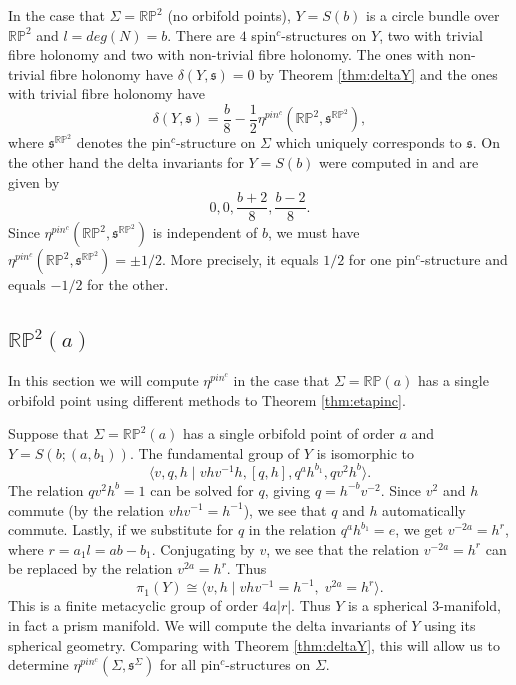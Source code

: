 \documentclass{amsart}
\theoremstyle{definition}
\theoremstyle{remark}
\numberwithin{equation}{section}
\begin{document}
In the case that $\Sigma = \mathbb{RP}^2$ (no orbifold points), $Y = S(b)$ is a circle bundle over $\mathbb{RP}^2$ and $l = deg(N) = b$. There are $4$ spin$^c$-structures on $Y$, two with trivial fibre holonomy and two with non-trivial fibre holonomy. The ones with non-trivial fibre holonomy have $\delta(Y , \mathfrak{s}) = 0$ by Theorem \ref{thm:deltaY} and the ones with trivial fibre holonomy have
\[
\delta( Y , \mathfrak{s} ) = \frac{b}{8} - \frac{1}{2} \eta^{pin^c}(\mathbb{RP}^2 , \mathfrak{s}^{\mathbb{RP}^2}),
\]
where $\mathfrak{s}^{\mathbb{RP}^2}$ denotes the pin$^c$-structure on $\Sigma$ which uniquely corresponds to $\mathfrak{s}$. On the other hand the delta invariants for $Y = S(b)$ were computed in \cite[]{bar} and are given by
\[
0,0, \frac{b+2}{8}, \frac{b-2}{8}.
\]
Since $\eta^{pin^c}(\mathbb{RP}^2 , \mathfrak{s}^{\mathbb{RP}^2})$ is independent of $b$, we must have $\eta^{pin^c}( \mathbb{RP}^2 , \mathfrak{s}^{\mathbb{RP}^2}) = \pm 1/2$. More precisely, it equals $1/2$ for one pin$^c$-structure and equals $-1/2$ for the other.



\subsection{$\mathbb{RP}^2(a)$}\label{sec:rp2a}

In this section we will compute $\eta^{pin^c}$ in the case that $\Sigma = \mathbb{RP}(a)$ has a single orbifold point using different methods to Theorem \ref{thm:etapinc}.

Suppose that $\Sigma = \mathbb{RP}^2(a)$ has a single orbifold point of order $a$ and $Y = S( b ; (a , b_1))$. The fundamental group of $Y$ is isomorphic to
\[
\langle v , q , h \; | \; vhv^{-1}h, [q,h] , q^a h^{b_1} , qv^2 h^b \rangle.
\]
The relation $qv^2 h^b = 1$ can be solved for $q$, giving $q = h^{-b} v^{-2}$. Since $v^2$ and $h$ commute (by the relation $vhv^{-1} = h^{-1}$), we see that $q$ and $h$ automatically commute. Lastly, if we substitute for $q$ in the relation $q^a h^{b_1} = e$, we get $v^{-2a} = h^r$, where $r = a_1 l = ab - b_1$. Conjugating by $v$, we see that the relation $v^{-2a} = h^r$ can be replaced by the relation $v^{2a} = h^r$. Thus
\[
\pi_1(Y) \cong \langle v , h \; | \; vhv^{-1} = h^{-1}, \; v^{2a} = h^r \rangle.
\]
This is a finite metacyclic group of order $4a|r|$. Thus $Y$ is a spherical $3$-manifold, in fact a prism manifold. We will compute the delta invariants of $Y$ using its spherical geometry. Comparing with Theorem \ref{thm:deltaY}, this will allow us to determine $\eta^{pin^c}( \Sigma , \mathfrak{s}^\Sigma)$ for all pin$^c$-structures on $\Sigma$.
\end{document}
